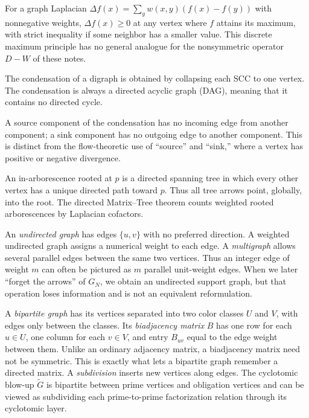 \documentclass[11pt]{article}
\theoremstyle{definition}
\theoremstyle{remark}
\begin{document}
\begin{description}[style=nextline,leftmargin=1.5em]
\item[Maximum principle.]
For a graph Laplacian $\Delta f(x)=\sum_y w(x,y)(f(x)-f(y))$ with
nonnegative weights, $\Delta f(x)\ge0$ at any vertex where $f$ attains its
maximum, with strict inequality if some neighbor has a smaller value.  This
discrete maximum principle has no general analogue for the nonsymmetric
operator $D-W$ of these notes.

\item[Condensation digraph.]
The condensation of a digraph is obtained by collapsing each SCC to one
vertex.  The condensation is always a directed acyclic graph (DAG), meaning
that it contains no directed cycle.

\item[Source and sink components.]
A source component of the condensation has no incoming edge from another
component; a sink component has no outgoing edge to another component.  This
is distinct from the flow-theoretic use of ``source'' and ``sink,'' where a
vertex has positive or negative divergence.

\item[In-arborescence.]
An in-arborescence rooted at $p$ is a directed spanning tree in which every
other vertex has a unique directed path toward $p$.  Thus all tree arrows
point, globally, into the root.  The directed Matrix--Tree theorem counts
weighted rooted arborescences by Laplacian cofactors.

\item[Undirected graph, weighted graph, and multigraph.]
An \emph{undirected graph} has edges $\{u,v\}$ with no preferred direction.
A weighted undirected graph assigns a numerical weight to each edge.  A
\emph{multigraph} allows several parallel edges between the same two vertices.
Thus an integer edge of weight $m$ can often be pictured as $m$ parallel
unit-weight edges.  When we later ``forget the arrows'' of $G_N$, we obtain an
undirected support graph, but that operation loses information and is not an
equivalent reformulation.

\item[Bipartite graph, biadjacency matrix, and subdivision.]
A \emph{bipartite graph} has its vertices separated into two color classes
$U$ and $V$, with edges only between the classes.  Its \emph{biadjacency
matrix} $B$ has one row for each $u\in U$, one column for each $v\in V$, and
entry $B_{uv}$ equal to the edge weight between them.  Unlike an ordinary
adjacency matrix, a biadjacency matrix need not be symmetric.  This is exactly
what lets a bipartite graph remember a directed matrix.  A \emph{subdivision}
inserts new vertices along edges.  The cyclotomic blow-up $\widetilde G$ is
bipartite between prime vertices and obligation vertices and can be viewed as
subdividing each prime-to-prime factorization relation through its cyclotomic
layer.


\end{description}
\end{document}
